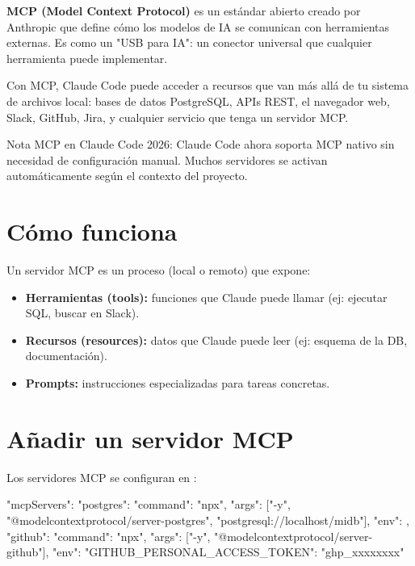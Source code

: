\documentclass[11pt,a4paper]{report}
\DeclareRobustCommand{\texttt}[1]{{\ttfamily\seqsplit{#1}}}
\begin{document}
\textbf{MCP (Model Context Protocol)} es un estándar abierto creado por Anthropic que define cómo los modelos de IA se comunican con herramientas externas. Es como un "USB para IA": un conector universal que cualquier herramienta puede implementar.

Con MCP, Claude Code puede acceder a recursos que van más allá de tu sistema de archivos local: bases de datos PostgreSQL, APIs REST, el navegador web, Slack, GitHub, Jira, y cualquier servicio que tenga un servidor MCP.

\begin{calloutbox}{Nota}
MCP en Claude Code 2026: Claude Code ahora soporta MCP nativo sin necesidad de configuración manual. Muchos servidores se activan automáticamente según el contexto del proyecto.\end{calloutbox}

\section{Cómo funciona}

Un servidor MCP es un proceso (local o remoto) que expone:

\begin{itemize}
\item \textbf{Herramientas (tools):} funciones que Claude puede llamar (ej: ejecutar SQL, buscar en Slack).
\item \textbf{Recursos (resources):} datos que Claude puede leer (ej: esquema de la DB, documentación).
\item \textbf{Prompts:} instrucciones especializadas para tareas concretas.
\end{itemize}

\section{Añadir un servidor MCP}

Los servidores MCP se configuran en \texttt{.claude/settings.json}:

\begin{codebox}
{
  "mcpServers": {
    "postgres": {
      "command": "npx",
      "args": ["-y", "@modelcontextprotocol/server-postgres",
               "postgresql://localhost/midb"],
      "env": {}
    },
    "github": {
      "command": "npx",
      "args": ["-y", "@modelcontextprotocol/server-github"],
      "env": {
        "GITHUB_PERSONAL_ACCESS_TOKEN": "ghp_xxxxxxxx"
      }
    }
  }
}
\end{codebox}
\end{document}
